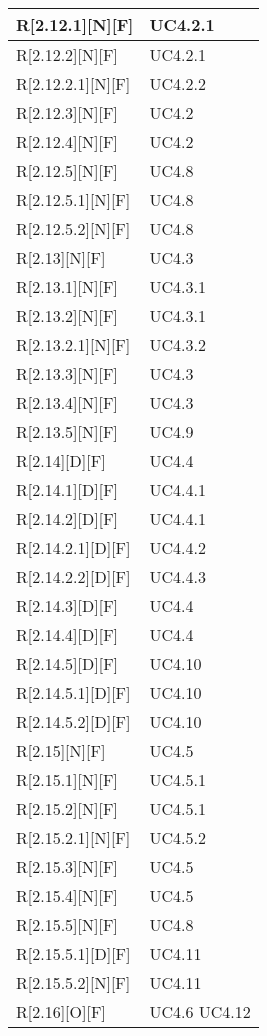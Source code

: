 \begin{longtable}{X | X}
\hline
R[2.12.1][N][F] & UC4.2.1 \\
\hline
R[2.12.2][N][F] & UC4.2.1 \\
\hline
R[2.12.2.1][N][F] & UC4.2.2 \\
\hline
R[2.12.3][N][F] & UC4.2 \\
\hline
R[2.12.4][N][F] & UC4.2 \\
\hline
R[2.12.5][N][F] & UC4.8 \\
\hline
R[2.12.5.1][N][F] & UC4.8 \\
\hline
R[2.12.5.2][N][F] & UC4.8 \\
\hline
R[2.13][N][F] & UC4.3 \\
\hline
R[2.13.1][N][F] & UC4.3.1 \\
\hline
R[2.13.2][N][F] & UC4.3.1 \\
\hline
R[2.13.2.1][N][F] & UC4.3.2 \\
\hline
R[2.13.3][N][F] & UC4.3 \\
\hline
R[2.13.4][N][F] & UC4.3 \\
\hline
R[2.13.5][N][F] & UC4.9 \\
\hline
R[2.14][D][F] & UC4.4 \\
\hline
R[2.14.1][D][F] & UC4.4.1 \\
\hline
R[2.14.2][D][F] & UC4.4.1 \\
\hline
R[2.14.2.1][D][F] & UC4.4.2 \\
\hline
R[2.14.2.2][D][F] & UC4.4.3 \\
\hline
R[2.14.3][D][F] & UC4.4 \\
\hline
R[2.14.4][D][F] & UC4.4 \\
\hline
R[2.14.5][D][F] & UC4.10 \\
\hline
R[2.14.5.1][D][F] & UC4.10 \\
\hline
R[2.14.5.2][D][F] & UC4.10 \\
\hline
R[2.15][N][F] & UC4.5 \\
\hline
R[2.15.1][N][F] & UC4.5.1 \\
\hline
R[2.15.2][N][F] & UC4.5.1 \\
\hline
R[2.15.2.1][N][F] & UC4.5.2 \\
\hline
R[2.15.3][N][F] & UC4.5 \\
\hline
R[2.15.4][N][F] & UC4.5 \\
\hline
R[2.15.5][N][F] & UC4.8 \\
\hline
R[2.15.5.1][D][F] & UC4.11 \\
\hline
R[2.15.5.2][N][F] & UC4.11 \\
\hline
R[2.16][O][F] & UC4.6 \newline UC4.12 \\

\end{longtable}
